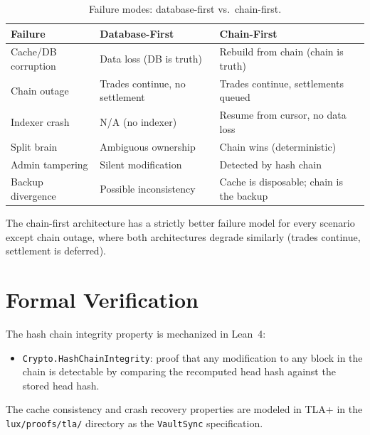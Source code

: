 \documentclass[11pt,a4paper]{article}
\begin{document}
\begin{table}[h]
\centering
\begin{tabular}{p{3.5cm}p{4.5cm}p{4.5cm}}
\toprule
\textbf{Failure} & \textbf{Database-First} & \textbf{Chain-First} \\
\midrule
Cache/DB corruption & Data loss (DB is truth) & Rebuild from chain
  (chain is truth) \\
Chain outage & Trades continue, no settlement & Trades continue,
  settlements queued \\
Indexer crash & N/A (no indexer) & Resume from cursor, no data loss \\
Split brain & Ambiguous ownership & Chain wins (deterministic) \\
Admin tampering & Silent modification & Detected by hash chain \\
Backup divergence & Possible inconsistency & Cache is disposable;
  chain is the backup \\
\bottomrule
\end{tabular}
\caption{Failure modes: database-first vs.\ chain-first.}
\label{tab:failures}
\end{table}

The chain-first architecture has a strictly better failure model for
every scenario except chain outage, where both architectures degrade
similarly (trades continue, settlement is deferred).

\section{Formal Verification}
\label{sec:formal}

The hash chain integrity property is mechanized in Lean~4:

\begin{itemize}[nosep]
  \item \texttt{Crypto.HashChainIntegrity}: proof that any modification
        to any block in the chain is detectable by comparing the
        recomputed head hash against the stored head hash.
\end{itemize}

The cache consistency and crash recovery properties are modeled in
TLA+ in the \texttt{lux/proofs/tla/} directory as the
\texttt{VaultSync} specification.

\end{document}

